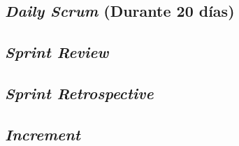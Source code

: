 \begin{spacing}{1.5}
	\subsection{\textit{Daily Scrum} (Durante 20 d\'{i}as)}
	\subsection{\textit{Sprint Review}}
	\subsection{\textit{Sprint Retrospective}}
	
	\subsection{\textit{Increment}}
\end{spacing}